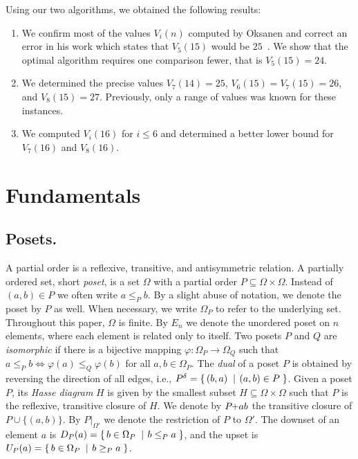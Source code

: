 \documentclass[a4paper,UKenglish,cleveref, autoref, thm-restate, anonymous]{lipics-v2021}
\makeatletter
\newcommand{\set}[2]{\left\{\, \mathinner{#1}\vphantom{#2}\: \left|\: \vphantom{#1}\mathinner{#2} \right.\,\right\}}
\newcommand\ie{i.e\@., }
\newcommand{\sse}{\subseteq}
\newcommand{\pchild}[3]{{#1}\kern-1pt{+}{#2}{#3}}
\newcommand{\dual}[1]{{#1}^{\delta}}
\newcommand{\less}[2]{D_{#1}(#2)}
\newcommand{\greater}[2]{U_{#1}(#2)}
\makeatother
\begin{document}
Using our two algorithms, we obtained the following results:
\begin{enumerate}
  \item We confirm most of the values $V_i(n)$ computed by Oksanen and correct an error in his work which states that $V_5(15)$ would be $25$~\cite{Oksanen}.
        We show that the optimal algorithm requires one comparison fewer, that is $V_5(15) = 24$.
  \item We determined the precise values $V_7(14) = 25$, $V_6(15) = V_7(15) = 26$, and $V_8(15) = 27$.
        Previously, only a range of values was known for these instances.
  \item We computed $V_i(16)$ for $i \leq 6$ and determined a better lower bound for $V_7(16)$ and $V_8(16)$.
\end{enumerate}


\section{Fundamentals}

\subsection{Posets.}
A partial order is a reflexive, transitive, and antisymmetric relation.
A partially ordered set, short \emph{poset}, is a set $\Omega$ with a partial order $P \subseteq \Omega \times \Omega$.
Instead of $(a, b) \in P$ we often write $a \le_P b$.
By a slight abuse of notation, we denote the poset by $P$ as well.
When necessary, we write $\Omega_P$ to refer to the underlying set.
Throughout this paper, $\Omega$ is finite.
By $E_n$ we denote the unordered poset on $n$ elements, where each element is related only to itself.
Two posets $P$ and $Q$ are \emph{isomorphic} if there is a bijective mapping $\varphi: \Omega_P \to \Omega_Q$ such that $a \le_P b \iff \varphi(a) \le_Q \varphi(b)$ for all $a, b \in \Omega_P$.
The \emph{dual} of a poset $P$ is obtained by reversing the direction of all edges, \ie $\dual{P} = \set{(b,a)}{(a,b) \in P}$.
Given a poset $P$, its \emph{Hasse diagram} $H$ is given by the smallest subset $H \sse \Omega \times \Omega$ such that $P$ is the reflexive, transitive closure of $H$.
We denote by $\pchild{P}{a}{b}$ the transitive closure of $P \cup \{(a, b)\}$.
By $P|_{\Omega'}$ we denote the restriction of $P$ to $\Omega'$.
The downset of an element $a$ is $\less{P}{a} = \set{b \in \Omega_P}{b \le_P a}$, and the upset is $\greater{P}{a} = \set{b \in \Omega_P}{b \ge_P a}$.
\end{document}
